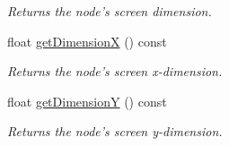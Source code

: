 \begin{DoxyCompactItemize}
\begin{DoxyCompactList}\small\item\em Returns the node's screen dimension. \end{DoxyCompactList}\item 
\hypertarget{class_ui_base_af8b5e2e29164a9847c5fb23c02ffe098}{float \hyperlink{class_ui_base_af8b5e2e29164a9847c5fb23c02ffe098}{get\-Dimension\-X} () const }\label{class_ui_base_af8b5e2e29164a9847c5fb23c02ffe098}

\begin{DoxyCompactList}\small\item\em Returns the node's screen x-\/dimension. \end{DoxyCompactList}\item 
\hypertarget{class_ui_base_a9375d0565a1137d1b2963dcd7c8bdd96}{float \hyperlink{class_ui_base_a9375d0565a1137d1b2963dcd7c8bdd96}{get\-Dimension\-Y} () const }\label{class_ui_base_a9375d0565a1137d1b2963dcd7c8bdd96}

\begin{DoxyCompactList}\small\item\em Returns the node's screen y-\/dimension. \end{DoxyCompactList}\end{DoxyCompactItemize}

